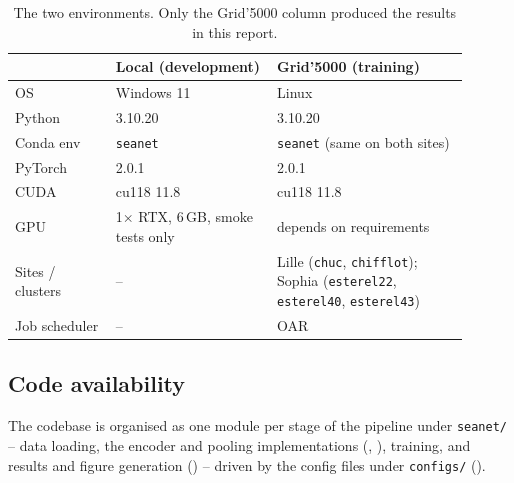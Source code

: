 \begin{table}[htbp]
\caption{The two environments. Only the Grid'5000 column produced the results in this report.}
\label{tab:environment}
\begin{center}
\small
\begin{tabular}{p{0.20\linewidth} p{0.32\linewidth} p{0.38\linewidth}}
\toprule
 & \textbf{Local (development)} & \textbf{Grid'5000 (training)} \\
\midrule
OS              & Windows 11 & Linux \\
Python          & 3.10.20 & 3.10.20 \\
Conda env       & \texttt{seanet} & \texttt{seanet} (same on both sites) \\
PyTorch         & 2.0.1 & 2.0.1 \\
CUDA            & cu118 11.8 & cu118 11.8 \\
GPU             & 1$\times$ RTX, 6\,GB, smoke tests only & depends on requirements \\
Sites / clusters & -- & Lille (\texttt{chuc}, \texttt{chifflot}); Sophia
                        (\texttt{esterel22}, \texttt{esterel40}, \texttt{esterel43}) \\
Job scheduler   & --   & OAR \\
\bottomrule
\end{tabular}
\end{center}
\end{table}

\subsection{Code availability}
\label{app:code}

The codebase is organised as one module per stage of the pipeline under \texttt{seanet/} -- data
loading, the encoder and pooling implementations (, ),
training, and results and figure generation () -- driven by the config
files under \texttt{configs/} ().


